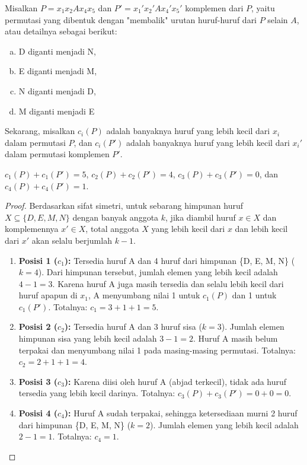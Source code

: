 \begin{solusi}
    Misalkan $P = x_1x_2Ax_4x_5$ dan $P' = x_1'x_2'Ax_4'x_5'$ komplemen dari $P$, yaitu permutasi yang dibentuk dengan "membalik" urutan huruf-huruf dari $P$ selain $A$, atau detailnya sebagai berikut:
    \begin{enumerate}[(a)]
    \item D diganti menjadi N,
    \item E diganti menjadi M,
    \item N diganti menjadi D,
    \item M diganti menjadi E
    \end{enumerate}
    Sekarang, misalkan $c_i(P)$ adalah banyaknya huruf yang lebih kecil dari $x_i$ dalam permutasi $P$, dan $c_i(P')$ adalah banyaknya huruf yang lebih kecil dari $x_i'$ dalam permutasi komplemen $P'$.
    
    \begin{lemma*}
        $c_1(P)+c_1(P')=5$, $c_2(P)+c_2(P')=4$, $c_3(P)+c_3(P')=0$, dan $c_4(P)+c_4(P')=1$.
        \begin{proof}
        Berdasarkan sifat simetri, untuk sebarang himpunan huruf $X \subseteq \{D, E, M, N\}$ dengan banyak anggota $k$, jika diambil huruf $x \in X$ dan komplemennya $x' \in X$, total anggota $X$ yang lebih kecil dari $x$ dan lebih kecil dari $x'$ akan selalu berjumlah $k-1$.
        \begin{enumerate}
            \item \textbf{Posisi 1 ($c_1$):} Tersedia huruf A dan 4 huruf dari himpunan \{D, E, M, N\} ($k=4$). Dari himpunan tersebut, jumlah elemen yang lebih kecil adalah $4-1=3$. Karena huruf A juga masih tersedia dan selalu lebih kecil dari huruf apapun di $x_1$, A menyumbang nilai 1 untuk $c_1(P)$ dan 1 untuk $c_1(P')$. Totalnya: $c_1 = 3 + 1 + 1 = 5$.
            \item \textbf{Posisi 2 ($c_2$):} Tersedia huruf A dan 3 huruf sisa ($k=3$). Jumlah elemen himpunan sisa yang lebih kecil adalah $3-1=2$. Huruf A masih belum terpakai dan menyumbang nilai 1 pada masing-masing permutasi. Totalnya: $c_2 = 2 + 1 + 1 = 4$.
            \item \textbf{Posisi 3 ($c_3$):} Karena diisi oleh huruf A (abjad terkecil), tidak ada huruf tersedia yang lebih kecil darinya. Totalnya: $c_3(P) + c_3(P') = 0 + 0 = 0$.
            \item \textbf{Posisi 4 ($c_4$):} Huruf A sudah terpakai, sehingga ketersediaan murni 2 huruf dari himpunan \{D, E, M, N\} ($k=2$). Jumlah elemen yang lebih kecil adalah $2-1=1$. Totalnya: $c_4 = 1$.
        \end{enumerate}
        \end{proof}
    \end{lemma*}


\end{solusi}
